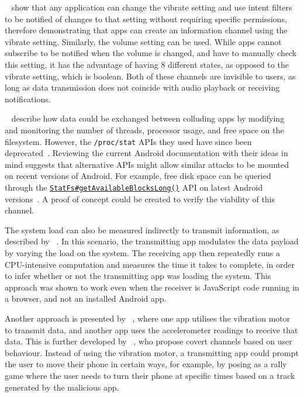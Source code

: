 \documentclass[article]{aaltoseries}
\begin{document}
\citeauthor{Schlegel2011}~\cite{Schlegel2011} show that any application can change the vibrate setting and use intent filters to be notified of changes to that setting without requiring specific permissions, therefore demonstrating that apps can create an information channel using the vibrate setting. Similarly, the volume setting can be used. While apps cannot subscribe to be notified when the volume is changed, and have to manually check this setting, it has the advantage of having 8 different states, as opposed to the vibrate setting, which is boolean. Both of these channels are invisible to users, as long as data transmission does not coincide with audio playback or receiving notifications.

\citeauthor{Marforio2012}~\cite{Marforio2012} describe how data could be exchanged between colluding apps by modifying and monitoring the number of threads, processor usage, and free space on the filesystem. However, the \texttt{/proc/stat} APIs they used have since been deprecated~\cite{nn2017}. Reviewing the current Android documentation with their ideas in mind suggests that alternative APIs might allow similar attacks to be mounted on recent versions of Android. For example, free disk space can be queried through the \href{https://developer.android.com/reference/android/os/StatFs.html#getAvailableBlocksLong()}{\texttt{StatFs\#getAvailableBlocksLong()}} API on latest Android versions~\cite{AOSPdeveloper}. A proof of concept could be created to verify the viability of this channel.

The system load can also be measured indirectly to transmit information, as described by \citeauthor{Marforio2012}~\cite{Marforio2012}. In this scenario, the transmitting app modulates the data payload by varying the load on the system. The receiving app then repeatedly runs a CPU-intensive computation and measures the time it takes to complete, in order to infer whether or not the transmitting app was loading the system. This approach was shown to work even when the receiver is JavaScript code running in a browser, and not an installed Android app.

Another approach is presented by \citeauthor{Al-Haiqi2014}~\cite{Al-Haiqi2014}, where one app utilises the vibration motor to transmit data, and another app uses the accelerometer readings to receive that data. This is further developed by \citeauthor{Qi2018}~\cite{Qi2018}, who propose covert channels based on user behaviour. Instead of using the vibration motor, a transmitting app could prompt the user to move their phone in certain ways, for example, by posing as a rally game where the user needs to turn their phone at specific times based on a track generated by the malicious app.
\end{document}
